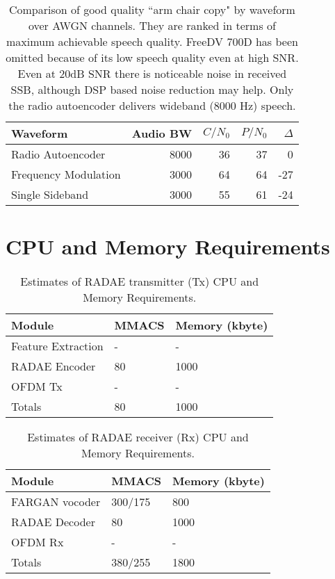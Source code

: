 \documentclass{article}
\begin{document}
\begin{table} [H]
\centering
\begin{tabular}{l r r r r}
 \hline
 Waveform             & Audio BW & $C/N_0$ & $P/N_0$ & $\Delta$ \\
 \hline
 Radio Autoencoder    & 8000 & 36 & 37 &   0 \\
 Frequency Modulation & 3000 & 64 & 64 & -27 \\
 Single Sideband      & 3000 & 55 & 61 & -24 \\
 \hline
\end{tabular}
\caption{Comparison of good quality ``arm chair copy" by waveform over AWGN channels. They are ranked in terms of maximum achievable speech quality. FreeDV 700D has been omitted because of its low speech quality even at high SNR. Even at 20dB SNR there is noticeable noise in received SSB, although DSP based noise reduction may help. Only the radio autoencoder delivers wideband (8000 Hz) speech.}
\label{tab:waveforms_good}
\end{table}

\section{CPU and Memory Requirements}

\begin{table} [H]
\centering
\begin{tabular}{l l l}
 \hline
 Module & MMACS & Memory (kbyte) \\
 \hline
 Feature Extraction &  - & - \\
 RADAE Encoder & 80 & 1000 \\
 OFDM Tx & - &  - \\
 \hline
 Totals & 80 & 1000 \\
 \hline
\end{tabular}
\caption{Estimates of RADAE transmitter (Tx) CPU and Memory Requirements.}
\label{tab:radae_tx_resources}

\end{table}
\begin{table} [H]
\centering
\begin{tabular}{l l l}
 \hline
 Module & MMACS & Memory (kbyte) \\
 \hline
 FARGAN vocoder &  300/175 &  800 \\
 RADAE Decoder & 80 & 1000 \\
 OFDM Rx & - & - \\
 \hline
 Totals & 380/255 & 1800 \\
 \hline
\end{tabular}
\caption{Estimates of RADAE receiver (Rx) CPU and Memory Requirements.}
\label{tab:radae_rx_resources}
\end{table}
\end{document}
